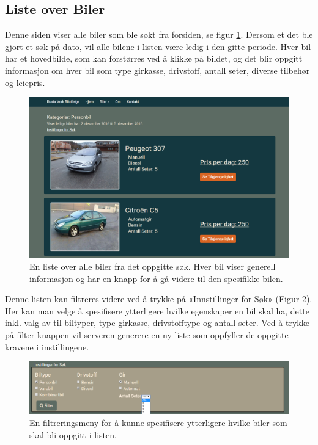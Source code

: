 \subsection{Liste over Biler}
Denne siden viser alle biler som ble søkt fra forsiden, se figur \ref{fig:rv_carlist}. Dersom et det ble gjort et søk på dato, vil alle bilene i listen være ledig i den gitte periode. Hver bil har et hovedbilde, som kan forstørres ved å klikke på bildet, og det blir oppgitt informasjon om hver bil som type girkasse, drivstoff, antall seter, diverse tilbehør og leiepris. 

 \begin{figure}[htbp]
	\centering
		\includegraphics[scale=0.4]{Bilder/rv_carlist.png}
	\caption[Liste over Biler]{En liste over alle biler fra det oppgitte søk. Hver bil viser generell informasjon og har en knapp for å gå videre til den spesifikke bilen. } %
	\label{fig:rv_carlist}
\end{figure}

Denne listen kan filtreres videre ved å trykke på «Innstillinger for Søk» (Figur \ref{fig:rv_carlist_filter}). Her kan man velge å spesifisere ytterligere hvilke egenskaper en bil skal ha, dette inkl. valg av til biltyper, type girkasse, drivstofftype og antall seter. Ved å trykke på filter knappen vil serveren generere en ny liste som oppfyller de oppgitte kravene i instillingene.

 \begin{figure}[htbp]
	\centering
		\includegraphics[scale=0.5]{Bilder/rv_carlist_filter.png}
	\caption[Instillinger for Søk]{En filtreringsmeny for å kunne spesifisere ytterligere hvilke biler som skal bli oppgitt i listen.} %
	\label{fig:rv_carlist_filter}
\end{figure}



